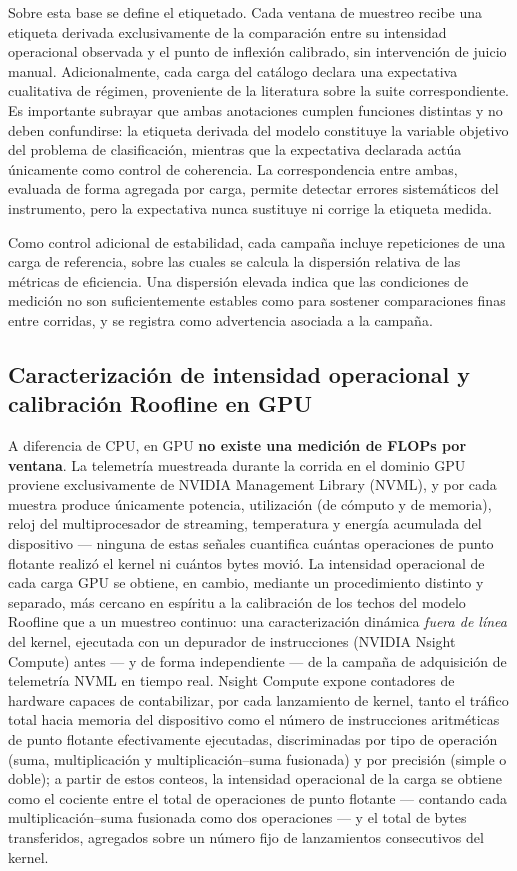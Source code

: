 \documentclass[12pt,oneside,spanish]{book}
\begin{document}
Sobre esta base se define el etiquetado. Cada ventana de muestreo recibe una etiqueta derivada exclusivamente de la comparación entre su intensidad operacional observada y el punto de inflexión calibrado, sin intervención de juicio manual. Adicionalmente, cada carga del catálogo declara una expectativa cualitativa de régimen, proveniente de la literatura sobre la suite correspondiente. Es importante subrayar que ambas anotaciones cumplen funciones distintas y no deben confundirse: la etiqueta derivada del modelo constituye la variable objetivo del problema de clasificación, mientras que la expectativa declarada actúa únicamente como control de coherencia. La correspondencia entre ambas, evaluada de forma agregada por carga, permite detectar errores sistemáticos del instrumento, pero la expectativa nunca sustituye ni corrige la etiqueta medida.

Como control adicional de estabilidad, cada campaña incluye repeticiones de una carga de referencia, sobre las cuales se calcula la dispersión relativa de las métricas de eficiencia. Una dispersión elevada indica que las condiciones de medición no son suficientemente estables como para sostener comparaciones finas entre corridas, y se registra como advertencia asociada a la campaña.

\subsection{Caracterización de intensidad operacional y calibración Roofline en GPU}
\label{sec:gpu-calibracion}

A diferencia de CPU, en GPU \textbf{no existe una medición de FLOPs por ventana}. La telemetría muestreada durante la corrida en el dominio GPU proviene exclusivamente de NVIDIA Management Library (NVML), y por cada muestra produce únicamente potencia, utilización (de cómputo y de memoria), reloj del multiprocesador de streaming, temperatura y energía acumulada del dispositivo --- ninguna de estas señales cuantifica cuántas operaciones de punto flotante realizó el kernel ni cuántos bytes movió. La intensidad operacional de cada carga GPU se obtiene, en cambio, mediante un procedimiento distinto y separado, más cercano en espíritu a la calibración de los techos del modelo Roofline que a un muestreo continuo: una caracterización dinámica \textit{fuera de línea} del kernel, ejecutada con un depurador de instrucciones (NVIDIA Nsight Compute) \cite{Nsight2026} antes --- y de forma independiente --- de la campaña de adquisición de telemetría NVML en tiempo real. Nsight Compute expone contadores de hardware capaces de contabilizar, por cada lanzamiento de kernel, tanto el tráfico total hacia memoria del dispositivo como el número de instrucciones aritméticas de punto flotante efectivamente ejecutadas, discriminadas por tipo de operación (suma, multiplicación y multiplicación--suma fusionada) y por precisión (simple o doble); a partir de estos conteos, la intensidad operacional de la carga se obtiene como el cociente entre el total de operaciones de punto flotante --- contando cada multiplicación--suma fusionada como dos operaciones --- y el total de bytes transferidos, agregados sobre un número fijo de lanzamientos consecutivos del kernel.
\end{document}
